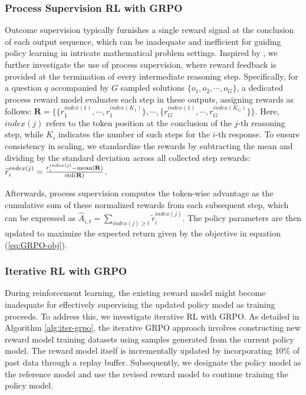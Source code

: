 \begin{itemize}[topsep=0pt]
\begin{itemize}[topsep=0pt]
\subsubsection{Process Supervision RL with GRPO}

Outcome supervision typically furnishes a single reward signal at the conclusion of each output sequence, which can be inadequate and inefficient for guiding policy learning in intricate mathematical problem settings. Inspired by \cite{wang2023math}, we further investigate the use of process supervision, where reward feedback is provided at the termination of every intermediate reasoning step. Specifically, for a question $q$ accompanied by $G$ sampled solutions $\{o_1, o_2, \cdots, o_G\}$, a dedicated process reward model evaluates each step in these outputs, assigning rewards as follows: $\mathbf{R} = \{ \{r_1^{index(1)},\cdots,r_1^{index(K_1)}\}, \cdots,  \{r_G^{index(1)},\cdots,r_G^{index(K_G)}\} \}$. Here, $index(j)$ refers to the token position at the conclusion of the $j$-th reasoning step, while $K_i$ indicates the number of such steps for the $i$-th response. To ensure consistency in scaling, we standardize the rewards by subtracting the mean and dividing by the standard deviation across all collected step rewards: $\widetilde{r}_i^{index(j)} = \frac{r_i^{index(j)} - {\rm mean(\mathbf{R})}}{{\rm std(\mathbf{R})}}$.

Afterwards, process supervision computes the token-wise advantage as the cumulative sum of these normalized rewards from each subsequent step, which can be expressed as $\hat{A}_{i, t} = \sum_{index(j) \ge t} \widetilde{r}_i^{index(j)}$. The policy parameters are then updated to maximize the expected return given by the objective in equation (\ref{eq:GRPO-obj}).

\subsubsection{Iterative RL with GRPO} During reinforcement learning, the existing reward model might become inadequate for effectively supervising the updated policy model as training proceeds. To address this, we investigate iterative RL with GRPO. As detailed in Algorithm \ref{alg:iter-grpo}, the iterative GRPO approach involves constructing new reward model training datasets using samples generated from the current policy model. The reward model itself is incrementally updated by incorporating 10\% of past data through a replay buffer. Subsequently, we designate the policy model as the reference model and use the revised reward model to continue training the policy model.


\end{itemize}
\end{itemize}
